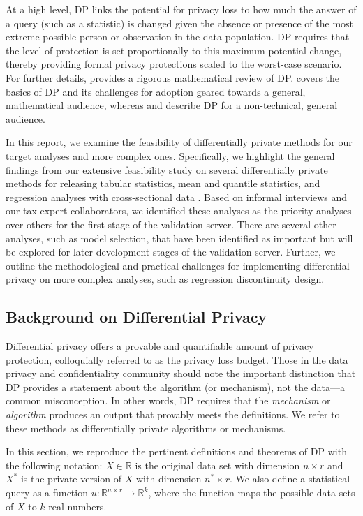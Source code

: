 At a high level, DP links the potential for privacy loss to how much the answer of a query (such as a statistic) is changed given the absence or presence of the most extreme possible person or observation in the data population. DP requires that the level of protection is set proportionally to this maximum potential change, thereby providing formal privacy protections scaled to the worst-case scenario. For further details, \citet{dwork2014algorithmic} provides a rigorous mathematical review of DP. \citet{bowen2021philosophy} covers the basics of DP and its challenges for adoption geared towards a general, mathematical audience, whereas \citet{nissim2017differential} and \citet{snoke2019differential} describe DP for a non-technical, general audience. 

In this report, we examine the feasibility of differentially private methods for our target analyses and more complex ones. Specifically, we highlight the general findings from our extensive feasibility study on several differentially private methods for releasing tabular statistics, mean and quantile statistics, and regression analyses with cross-sectional data \citep{barrientos2021}. Based on informal interviews and our tax expert collaborators, we identified these analyses as the priority analyses over others for the first stage of the validation server. There are several other analyses, such as model selection, that have been identified as important but will be explored for later development stages of the validation server. Further, we outline the methodological and practical challenges for implementing differential privacy on more complex analyses, such as regression discontinuity design.

\subsection{Background on Differential Privacy}\label{subsec:dp}
Differential privacy offers a provable and quantifiable amount of privacy protection, colloquially referred to as the privacy loss budget. Those in the data privacy and confidentiality community should note the important distinction that DP provides a statement about the algorithm (or mechanism), not the data---a common misconception. In other words, DP requires that the \textit{mechanism} or \textit{algorithm} produces an output that provably meets the definitions. We refer to these methods as differentially private algorithms or mechanisms.

In this section, we reproduce the pertinent definitions and theorems of DP with the following notation: $X\in\mathbb{R}$ is the original data set  with dimension ${n\times r}$ and $X^*$ is the private version of $X$ with dimension ${n^*\times r}$. We also define a statistical query as a function $u:\mathbb{R}^{n\times r}\rightarrow\mathbb{R}^k$, where the function maps the possible data sets of $X$ to $k$ real numbers.

